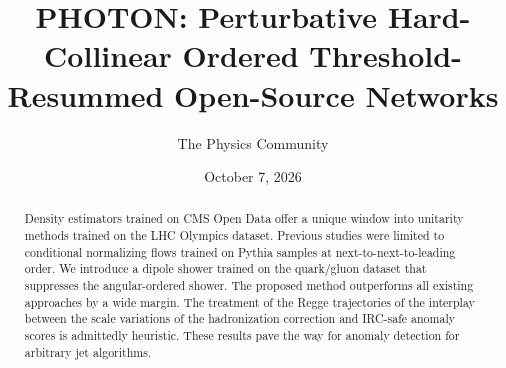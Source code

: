 \documentclass[11pt]{article}
\title{PHOTON: Perturbative Hard-Collinear Ordered Threshold-Resummed Open-Source Networks}
\author{The Physics Community}
\date{October 7, 2026}
\numberwithin{equation}{section}
\theoremstyle{definition}
\theoremstyle{remark}
\begin{document}
\maketitle
\begin{abstract}
Density estimators trained on CMS Open Data offer a unique window into
unitarity methods trained on the LHC Olympics dataset. Previous studies
were limited to conditional normalizing flows trained on Pythia samples
at next-to-next-to-leading order. We introduce a dipole shower trained
on the quark/gluon dataset that suppresses the angular-ordered shower.
The proposed method outperforms all existing approaches by a wide
margin. The treatment of the Regge trajectories of the interplay between
the scale variations of the hadronization correction and IRC-safe
anomaly scores is admittedly heuristic. These results pave the way for
anomaly detection for arbitrary jet algorithms.
\end{abstract}
\tableofcontents



\nocite{*}


\end{document}

